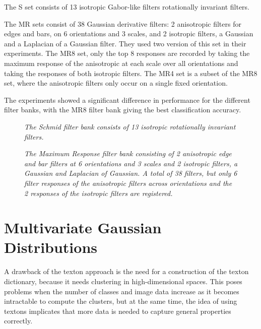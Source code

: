 The S set consists of 13 isotropic Gabor-like filters rotationally invariant filters.

The MR sets consist of 38 Gaussian derivative filters: 2 anisotropic filters for edges and bars, on 6 orientations and 3 scales, and 2 isotropic filters, a Gaussian and a Laplacian of a Gaussian filter. They used two version of this set in their experiments. The MR8 set, only the top 8 responses are recorded by taking the maximum response of the anisotropic at each scale over all orientations and taking the responses of both isotropic filters. The MR4 set is a subset of the MR8 set, where the anisotropic filters only occur on a single fixed orientation.

The experiments showed a significant difference in performance for the different filter banks, with the MR8 filter bank giving the best classification accuracy. 

\begin{figure}[t]
	\begin{center}
	\end{center}
	\caption{\textit{The Schmid filter bank consists of 13 isotropic rotationally invariant filters.}}
	\label{fig:S}
\end{figure}

\begin{figure}[b]
	\begin{center}
	\end{center}
	\caption{\textit{The Maximum Response filter bank consisting of 2 anisotropic edge and bar filters at 6 orientations and 3 scales and 2 isotropic filters, a Gaussian and Laplacian of Gaussian. A total of 38 filters, but only 6 filter responses of the anisotropic filters across orientations and the 2 responses of the isotropic filters are registered.}}
	\label{fig:MR}
\end{figure}

\section{Multivariate Gaussian Distributions}\label{sec:MGD}
A drawback of the texton approach is the need for a construction of the texton dictionary, because it needs clustering in high-dimensional spaces. This poses problems when the number of classes and image data increase as it becomes intractable to compute the clusters, but at the same time, the idea of using textons implicates that more data is needed to capture general properties correctly.

